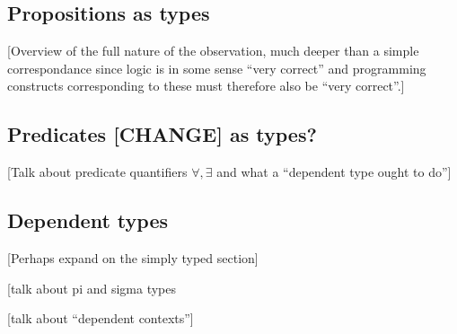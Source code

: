 \subsection{Propositions as types}

[Overview of the full nature of the observation, much deeper than a simple correspondance since logic is in some sense ``very correct'' and programming constructs corresponding to these must therefore also be ``very correct''.]

\subsection{Predicates [CHANGE] as types?}

[Talk about predicate quantifiers $\forall, \exists$ and what a ``dependent type ought to do'']


\subsection{Dependent types}




[Perhaps expand on the simply typed section]

[talk about pi and sigma types

[talk about ``dependent contexts'']


